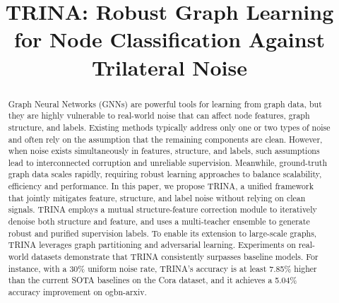 \documentclass[sigconf, anonymous, review]{acmart}
\begin{document}
\title{TRINA: Robust Graph Learning for Node Classification Against Trilateral Noise}







\begin{abstract}
  Graph Neural Networks (GNNs) are powerful tools for learning from graph data, but they are highly vulnerable to real-world noise that can affect node features, graph structure, and labels. Existing methods typically address only one or two types of noise and often rely on the assumption that the remaining components are clean. However, when noise exists simultaneously in features, structure, and labels, such assumptions lead to interconnected corruption and unreliable supervision. Meanwhile, ground-truth graph data scales rapidly, requiring robust learning approaches to balance scalability, efficiency and performance. In this paper, we propose TRINA,  a unified framework that jointly mitigates feature, structure, and label noise without relying on clean signals. TRINA employs a mutual structure-feature correction module to iteratively denoise both structure and feature, and uses a multi-teacher ensemble to generate robust and purified supervision labels.  To enable its extension to large-scale graphs, TRINA leverages graph partitioning and adversarial learning. Experiments on real-world datasets demonstrate that TRINA consistently surpasses baseline models. For instance, with a 30\% uniform noise rate, TRINA's accuracy is at least 7.85\% higher than the current SOTA baselines on the Cora dataset, and it achieves a 5.04\% accuracy improvement on ogbn-arxiv.
\end{abstract}
\end{document}
